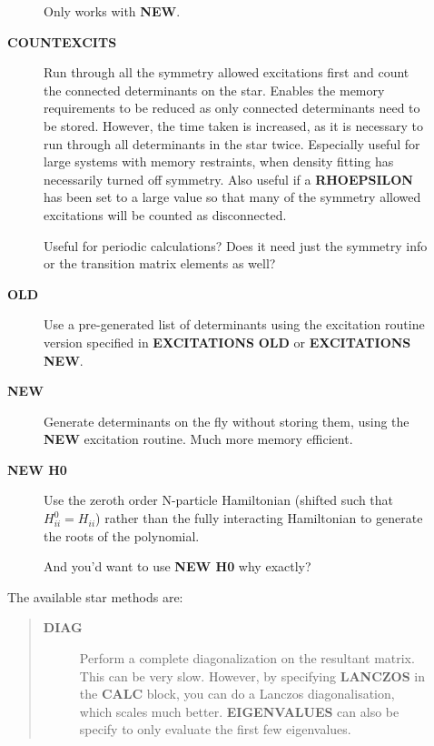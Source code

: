 \documentclass[openany,a4paper,10pt]{manual}
\begin{document}
\begin{description}
\begin{description}
Only works with \textbf{NEW}.

\item[\textbf{COUNTEXCITS}]
Run through all the symmetry allowed excitations
first and count the connected determinants on the star.  Enables the
memory requirements to be reduced as only connected determinants need
to be stored. However, the time taken is increased, as it is necessary
to run through all determinants in the star twice. Especially useful
for large systems with memory restraints, when density fitting has
necessarily turned off symmetry. Also useful if a \textbf{RHOEPSILON}
has been set to a large value so that many of the symmetry allowed
excitations  will be counted as disconnected.

\begin{notice}[note]
Useful for periodic calculations?  Does it need just the
symmetry info or the transition matrix elements as well?
\end{notice}

\item[\textbf{OLD}]
Use a pre-generated list of determinants using the excitation
routine version specified in \textbf{EXCITATIONS} \textbf{OLD} or
\textbf{EXCITATIONS} \textbf{NEW}.

\item[\textbf{NEW}]
Generate determinants on the fly without storing them, using
the \textbf{NEW} excitation routine.  Much more memory efficient.

\item[\textbf{NEW H0}]
Use the zeroth order N-particle Hamiltonian (shifted such that
$H^0_{ii} = H_{ii}$) rather than the fully interacting
Hamiltonian to generate the roots of the polynomial.

\begin{notice}[note]
And you'd want to use \textbf{NEW H0} why exactly?
\end{notice}

\end{description}

The available star methods are:
\begin{quote}
\begin{description}
\item[\textbf{DIAG}]
Perform a complete diagonalization on the resultant matrix.  This can
be very slow. However, by specifying \textbf{LANCZOS} in the \textbf{CALC}
block, you can do a Lanczos diagonalisation, which scales much
better. \textbf{EIGENVALUES} can also be specify to only evaluate the
first few eigenvalues.


\end{description}
\end{quote}
\end{description}
\end{document}
